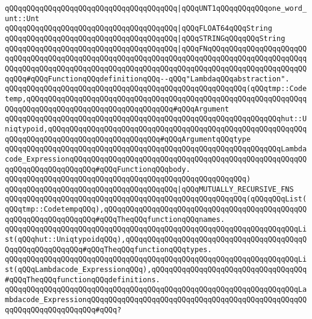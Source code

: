 \verb|qQQqqQQqqQQqqQQqqQQqqQQqqQQqqQQqqQQqqQQq|\verb#|qQQqUNT1qQQqqQQqqQQqone_word_unt::Unt#\newline
\verb|qQQqqQQqqQQqqQQqqQQqqQQqqQQqqQQqqQQqqQQq|\verb#|qQQqFLOAT64qQQqString#\newline
\verb|qQQqqQQqqQQqqQQqqQQqqQQqqQQqqQQqqQQqqQQq|\verb#|qQQqSTRINGqQQqqQQqString#\newline
\verb|qQQqqQQqqQQqqQQqqQQqqQQqqQQqqQQqqQQqqQQq|\verb#|qQQqFNqQQqqQQqqQQqqQQqqQQqqQQqqQQqqQQqqQQqqQQqqQQqqQQqqQQqqQQqqQQqqQQqqQQqqQQqqQQqqQQqqQQqqQQqqQQqqQQqqQQqqQQqqQQqqQQqqQQqqQQqqQQqqQQqqQQqqQQqqQQqqQQqqQQqqQQqqQQqqQQqqQQqqQQq#\verb|#qQQqFunctionqQQqdefinitionqQQq--qQQq"LambdaqQQqabstraction".|\newline
\verb|qQQqqQQqqQQqqQQqqQQqqQQqqQQqqQQqqQQqqQQqqQQqqQQqqQQqqQQq(qQQqtmp::Codetemp,qQQqqQQqqQQqqQQqqQQqqQQqqQQqqQQqqQQqqQQqqQQqqQQqqQQqqQQqqQQqqQQqqQQqqQQqqQQqqQQqqQQqqQQqqQQqqQQqqQQqqQQq#qQQqArgument|\newline
\verb|qQQqqQQqqQQqqQQqqQQqqQQqqQQqqQQqqQQqqQQqqQQqqQQqqQQqqQQqqQQqqQQqhut::Uniqtypoid,qQQqqQQqqQQqqQQqqQQqqQQqqQQqqQQqqQQqqQQqqQQqqQQqqQQqqQQqqQQqqQQqqQQqqQQqqQQqqQQqqQQqqQQqqQQqqQQq#qQQqArgumentqQQqtype|\newline
\verb|qQQqqQQqqQQqqQQqqQQqqQQqqQQqqQQqqQQqqQQqqQQqqQQqqQQqqQQqqQQqqQQqLambdacode_ExpressionqQQqqQQqqQQqqQQqqQQqqQQqqQQqqQQqqQQqqQQqqQQqqQQqqQQqqQQqqQQqqQQqqQQqqQQqqQQq#qQQqFunctionqQQqbody.|\newline
\verb|qQQqqQQqqQQqqQQqqQQqqQQqqQQqqQQqqQQqqQQqqQQqqQQqqQQqqQQq)|\newline
\newline
\verb|qQQqqQQqqQQqqQQqqQQqqQQqqQQqqQQqqQQqqQQq|\verb#|qQQqMUTUALLY_RECURSIVE_FNS#\newline
\verb|qQQqqQQqqQQqqQQqqQQqqQQqqQQqqQQqqQQqqQQqqQQqqQQqqQQqqQQq(qQQqqQQqList(qQQqtmp::CodetempqQQq),qQQqqQQqqQQqqQQqqQQqqQQqqQQqqQQqqQQqqQQqqQQqqQQqqQQqqQQqqQQqqQQqqQQq#qQQqTheqQQqfunctionqQQqnames.|\newline
\verb|qQQqqQQqqQQqqQQqqQQqqQQqqQQqqQQqqQQqqQQqqQQqqQQqqQQqqQQqqQQqqQQqqQQqList(qQQqhut::UniqtypoidqQQq),qQQqqQQqqQQqqQQqqQQqqQQqqQQqqQQqqQQqqQQqqQQqqQQqqQQqqQQqqQQq#qQQqTheqQQqfunctionqQQqtypes.|\newline
\verb|qQQqqQQqqQQqqQQqqQQqqQQqqQQqqQQqqQQqqQQqqQQqqQQqqQQqqQQqqQQqqQQqqQQqList(qQQqLambdacode_ExpressionqQQq),qQQqqQQqqQQqqQQqqQQqqQQqqQQqqQQqqQQq#qQQqTheqQQqfunctionqQQqdefinitions.|\newline
\verb|qQQqqQQqqQQqqQQqqQQqqQQqqQQqqQQqqQQqqQQqqQQqqQQqqQQqqQQqqQQqqQQqqQQqLambdacode_ExpressionqQQqqQQqqQQqqQQqqQQqqQQqqQQqqQQqqQQqqQQqqQQqqQQqqQQqqQQqqQQqqQQqqQQqqQQq#qQQq?|\newline
